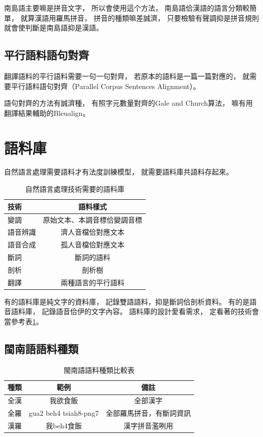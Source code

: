 南島語主要嘛是拼音文字，
所以會使用這个方法，
南島語佮漢語的語言分類較簡單，
就算漢語用羅馬拼音，
拼音的種類嘛差誠濟，
只要檢驗有聲調抑是拼音規則就會使判斷是南島語抑是漢語。

\subsection{平行語料語句對齊}
\label{小節：語句對齊}
翻譯語料的平行語料需要一句一句對齊，
若原本的語料是一篇一篇對應的，
就需要平行語料語句對齊（Parallel Corpus Sentences Alignment）。

語句對齊的方法有誠濟種，
有照字元數量對齊的Gale and Church算法\cite{gale1993program}，
嘛有用翻譯結果輔助的Bleualign\cite{zora38464}。

\section{語料庫}
\label{節：語料庫}
自然語言處理需要語料才有法度訓練模型，
就需要語料庫共語料存起來。

\begin{table}
\caption{自然語言處理技術需要的語料庫}
\label{表：自然語言處理技術需要的語料庫}
\centering
\begin{tabular}{l|c}
技術 & 語料樣式 \\
\hline
變調 & 原始文本、本調音標佮變調音標 \\
語音辨識 & 濟人音檔佮對應文本 \\
語音合成 & 孤人音檔佮對應文本 \\
斷詞 & 斷詞的語料 \\
剖析 & 剖析樹 \\
翻譯 & 兩種語言的平行語料 \\
\end{tabular}
\end{table}

有的語料庫是純文字的資料庫，
記錄雙語語料，抑是斷詞佮剖析資料。
有的是語音語料庫，
記錄語音佮伊的文字內容。
語料庫的設計愛看需求，
定看著的技術會當參考表\ref{表：自然語言處理技術需要的語料庫}。

\subsection{閩南語語料種類}
\label{節：閩南語語料種類}

\begin{table}
\caption{閩南語語料種類比較表}
\label{表：閩南語語料種類比較表}
\centering
\begin{tabular}{l|c|c}
種類 & 範例 & 備註\\
\hline
全漢 & 我欲食飯 & 全部漢字\\
全羅 & gua2 beh4 tsiah8-png7 & 全部羅馬拼音，有斷詞資訊\\
漢羅 &我beh4食飯 & 漢字拼音濫咧用\\
\end{tabular}
\end{table}

